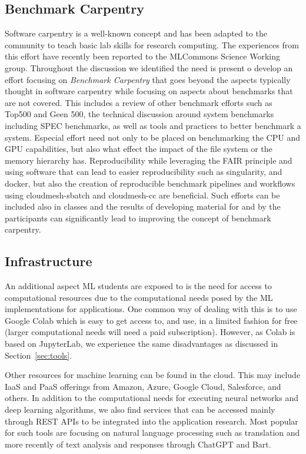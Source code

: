 \documentclass[utf8]{FrontiersinVancouver} %
\begin{document}
\subsection{Benchmark Carpentry}

Software carpentry \citep{software-carpentry} is a well-known concept
and has been adapted to the community to teach basic lab skills for
research computing.  The experiences from this effort have recently
been reported to the MLCommons Science Working group. Throughout
the discussion we identified the need is present o develop an effort
focusing on {\em Benchmark Carpentry} that goes beyond the aspects
typically thought in software carpentry while focusing on aspects
about benchmarks that are not covered. This includes a review of other
benchmark efforts such as Top500 and Geen 500, the technical
discussion around system benchmarks including SPEC benchmarks, as
well as tools and practices to better benchmark a system. Especial
effort need not only to be placed on benchmarking the CPU and GPU
capabilities, but also what effect the impact of the file system or
the memory hierarchy has. Reproducibility while leveraging the FAIR
principle and using software that can lead to easier reproducibility
such as singularity, and docker, but also the creation of reproducible
benchmark pipelines and workflows using cloudmesh-sbatch and
cloudmesh-cc are beneficial. Such efforts can be included also in
classes and the results of developing material for and by the
participants can significantly lead to improving the concept of
benchmark carpentry.

\subsection{Infrastructure}

An additional aspect ML students are exposed to is the need for access
to computational resources due to the computational needs posed by the
ML implementations for applications. One common way of dealing with
this is to use Google Colab which is easy to get access to, and use,
in a limited fashion for free (larger computational needs will need a
paid subscription).  However, as Colab is based on JupyterLab, we
experience the same disadvantages as discussed in
Section~\ref{sec:tools}.

Other resources for machine learning can be found in the cloud. This
may include IaaS and PaaS offerings from Amazon, Azure, Google Cloud,
Salesforce, and others.  In addition to the computational needs for
executing neural networks and deep learning algorithms, we also find
services that can be accessed mainly through REST APIs to be
integrated into the application research. Most popular for such tools
are focusing on natural language processing such as translation and
more recently of text analysis and responses through ChatGPT and Bart.
\end{document}

